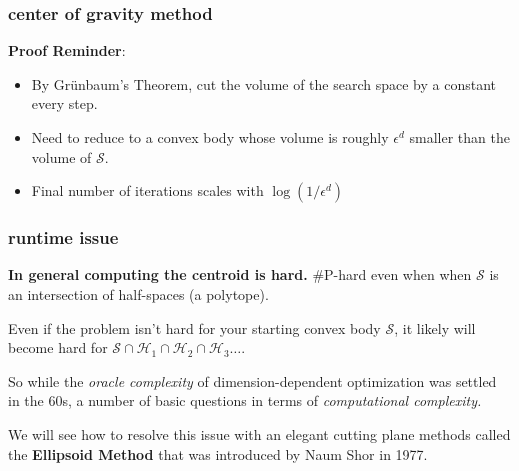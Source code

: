 \documentclass[compress]{beamer}
\begin{document}
\begin{frame}[t]
	\frametitle{center of gravity method}
	\textbf{Proof Reminder}:
	\begin{itemize}
		\item By Gr\"{u}nbaum's Theorem, cut the volume of the search space by a constant every step. 
		\item Need to reduce to a convex body whose volume is roughly $\epsilon^d$ smaller than the volume of $\mathcal{S}$.
		\item Final number of iterations scales with $\log(1/\epsilon^d)$
	\end{itemize}
\end{frame}

\begin{frame}[t]
		\frametitle{runtime issue}
		\textbf{In general computing the centroid is hard.} \#P-hard even when when $\mathcal{S}$ is an intersection of half-spaces (a polytope).
		
		Even if the problem isn't hard for your starting convex body $\mathcal{S}$, it likely will become hard for $\mathcal{S} \cap \mathcal{H}_1  \cap \mathcal{H}_2 \cap \mathcal{H}_3 \ldots$. 
		
		So while the \emph{oracle complexity} of dimension-dependent optimization was settled in the 60s, a number of basic questions in terms of \emph{computational complexity.}

		We will see how to resolve this issue with an elegant cutting plane methods called the \textbf{Ellipsoid Method} that was introduced by Naum Shor in 1977.
\end{frame}
\end{document}
